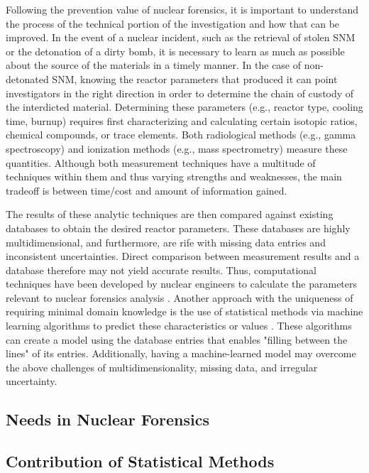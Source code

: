 Following the prevention value of nuclear forensics, it is important to
understand the process of the technical portion of the investigation and how
that can be improved.  In the event of a nuclear incident, such as the
retrieval of stolen \gls{SNM} or the detonation of a dirty bomb, it is
necessary to learn as much as possible about the source of the materials in a
timely manner. In the case of non-detonated \gls{SNM}, knowing the reactor
parameters that produced it can point investigators in the right direction in
order to determine the chain of custody of the interdicted material.
Determining these parameters (e.g., reactor type, cooling time, burnup)
requires first characterizing and calculating certain isotopic ratios, chemical
compounds, or trace elements.  Both radiological methods (e.g., gamma
spectroscopy) and ionization methods (e.g., mass spectrometry) measure these
quantities. Although both measurement techniques have a multitude of techniques
within them and thus varying strengths and weaknesses, the main tradeoff is
between time/cost and amount of information gained. 

The results of these analytic techniques are then compared against existing
databases to obtain the desired reactor parameters. These databases are highly
multidimensional, and furthermore, are rife with missing data entries and
inconsistent uncertainties. Direct comparison between measurement results and a
database therefore may not yield accurate results. Thus, computational
techniques have been developed by nuclear engineers to calculate the parameters
relevant to nuclear forensics analysis \cite{weber_2006, weber_2010,
weber_2011}. Another approach with the uniqueness of requiring minimal domain
knowledge is the use of statistical methods via machine learning algorithms to
predict these characteristics or values \cite{dayman_feasibility_2013,
robel_2009, nicolaou_2006, nicolaou_2009, nicolaou_2014, jones_snf_2014,
jones_viz_2014}. These algorithms can create a model using the database entries
that enables "filling between the lines" of its entries. Additionally, having a
machine-learned model may overcome the above challenges of multidimensionality,
missing data, and irregular uncertainty.

\subsection{Needs in Nuclear Forensics}

\label{sec:nfneeds}

\subsection{Contribution of Statistical Methods}

\label{sec:statscontrib}

